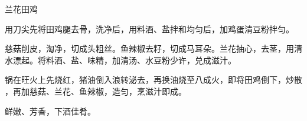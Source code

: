 \begin{recipe}{兰花田鸡}

\ingredients


\preparation

\step 用刀尖先将田鸡腿去骨，洗净后，用料酒、盐拌和均匀后，加鸡蛋清豆粉拌匀。

\step 慈菇削皮，淘净，切成头粗丝。鱼辣椒去籽，切成马耳朵。兰花抽心，去茎，用清
水漂起。将料酒、盐、味精，加清汤、水豆粉少许，兑成滋汁。

\step 锅在旺火上先烧红，猪油倒入浪转泌去，再换油烧至八成火，即将田鸡倒下，炒散
，再加慈菇、兰花、鱼辣椒，造匀，烹滋汁即成。

\features

鲜嫩、芳香，下酒佳肴。

\end{recipe}

